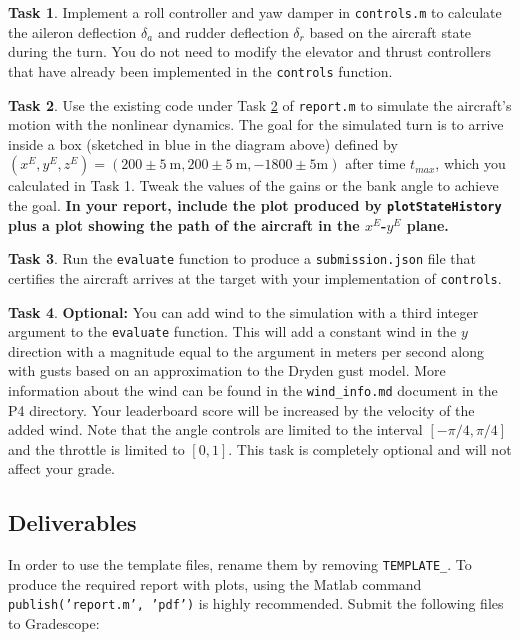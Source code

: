 \documentclass{article}
\theoremstyle{definition}
\newtheorem{task}{Task}
\begin{document}
\begin{task}
    Implement a roll controller and yaw damper in \texttt{controls.m} to calculate the aileron deflection $\delta_a$ and rudder deflection $\delta_r$ based on the aircraft state during the turn. 
You do not need to modify the elevator and thrust controllers that have already been implemented in the \texttt{controls} function.
\end{task}

\begin{task} \label{task:plot}
    Use the existing code under Task \ref{task:plot} of \texttt{report.m} to simulate the aircraft's motion with the nonlinear dynamics. The goal for the simulated turn is to arrive inside a box (sketched in blue in the diagram above) defined by $(x^E,y^E,z^E) = (200 \pm 5\ \text{m},200 \pm 5\ \text{m}, -1800 \pm 5 \text{m})$ after time $t_{max}$, which you calculated in Task 1. Tweak the values of the gains or the bank angle to achieve the goal.
    \textbf{In your report, include the plot produced by \texttt{plotStateHistory} plus a plot showing the path of the aircraft in the $x^E$-$y^E$ plane.}
\end{task}

\begin{task}
    Run the \texttt{evaluate} function to produce a \texttt{submission.json} file that certifies the aircraft arrives at the target with your implementation of \texttt{controls}.
\end{task}

\begin{task}
    \textbf{Optional:}
    You can add wind to the simulation with a third integer argument to the \texttt{evaluate} function. This will add a constant wind in the $y$ direction with a magnitude equal to the argument in meters per second along with gusts based on an approximation to the Dryden gust model. More information about the wind can be found in the \texttt{wind\_info.md} document in the P4 directory. Your leaderboard score will be increased by the velocity of the added wind. Note that the angle controls are limited to the interval $[-\pi/4, \pi/4]$ and the throttle is limited to $[0, 1]$. This task is completely optional and will not affect your grade.
\end{task}

\subsection*{Deliverables}
In order to use the template files, rename them by removing \texttt{TEMPLATE\_}. To produce the required report with plots, using the Matlab command \texttt{publish('report.m', 'pdf')} is highly recommended. Submit the following files to Gradescope:
\end{document}

